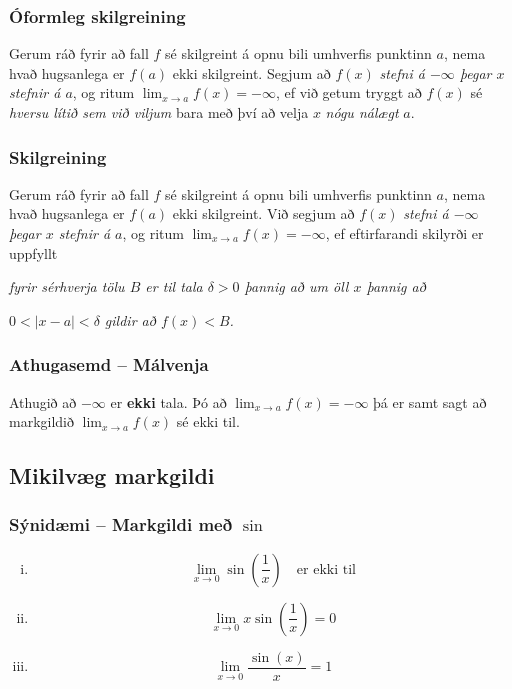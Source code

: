 \documentclass[icelandic,a4paper,12pt]{article}
\begin{document}
\subsubsection{Óformleg skilgreining}  Gerum ráð fyrir að fall $f$ sé
skilgreint á opnu bili umhverfis punktinn $a$, nema hvað hugsanlega er
$f(a)$ ekki skilgreint.  Segjum að  $f(x)$
{\it stefni á $-\infty$ þegar $x$ stefnir á $a$}, og ritum
$\lim_{x\rightarrow a} f(x)=-\infty$, ef við getum tryggt að  $f(x)$ sé {\em
  hversu lítið sem við viljum}
 bara með því að velja $x$ \emph{nógu nálægt} $a$.  
 
\pause
\subsubsection{Skilgreining}
 Gerum ráð fyrir að fall $f$ sé
skilgreint á opnu bili umhverfis punktinn $a$, nema hvað hugsanlega er
$f(a)$ ekki skilgreint.  Við segjum að $f(x)$
{\it stefni á $-\infty$ þegar $x$ stefnir á $a$}, og ritum
$\lim_{x\rightarrow a} f(x)=-\infty$, ef eftirfarandi skilyrði er uppfyllt

{\it fyrir sérhverja tölu $B$ er til tala $\delta>0$ þannig
  að um öll $x$ þannig að} 

\emph{$0<|x-a|<\delta$ 
gildir að  $f(x)<B$.}

\subsubsection{Athugasemd -- Málvenja}  Athugið að $-\infty$ er {\bf ekki} tala.  Þó 
að  $\lim_{x\rightarrow a} f(x)=-\infty$ þá er samt sagt að
markgildið $\lim_{x\rightarrow a} f(x)$ sé ekki til.
 
\subsection{Mikilvæg markgildi}
\subsubsection{Sýnidæmi -- Markgildi með $\sin$}
\begin{enumerate}[(i)] 
  \item $$\lim_{x\to 0} \sin\left(\frac 1x\right) \quad \text{er ekki til}$$
  \pause
  \item $$\lim_{x\to 0} x\sin\left(\frac 1x\right) = 0$$
  \pause
  \item $$\lim_{x \to 0} \frac{\sin(x)}{x} = 1$$
\end{enumerate}
\end{document}
